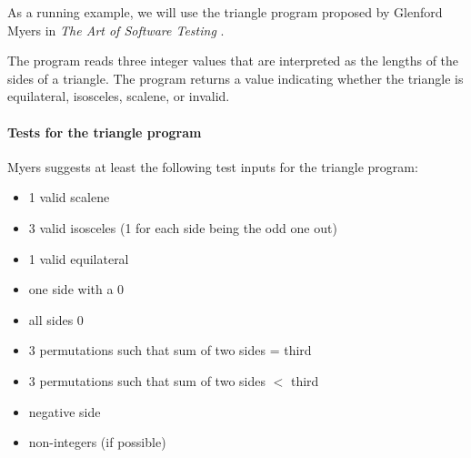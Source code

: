 \begin{example}
As a running example, we will use the triangle program proposed by Glenford Myers in {\em The Art of Software Testing} \cite{myers79}.

The program reads three integer values that are interpreted as the lengths of the sides of a triangle. The program returns a value indicating whether the triangle is equilateral, isosceles, scalene, or invalid.

\paragraph{Tests for the triangle program}

Myers suggests at least the following test inputs for the triangle program:

\begin{itemize}
 \item 1 valid scalene
 \item 3 valid isosceles (1 for each side being the odd one out)
 \item 1 valid equilateral
 \item one side with a 0
 \item all sides 0
 \item 3 permutations such that sum of two sides = third
 \item 3 permutations such that sum of two sides $<$ third
 \item negative side
 \item non-integers (if possible)

\end{itemize}
\end{example}

